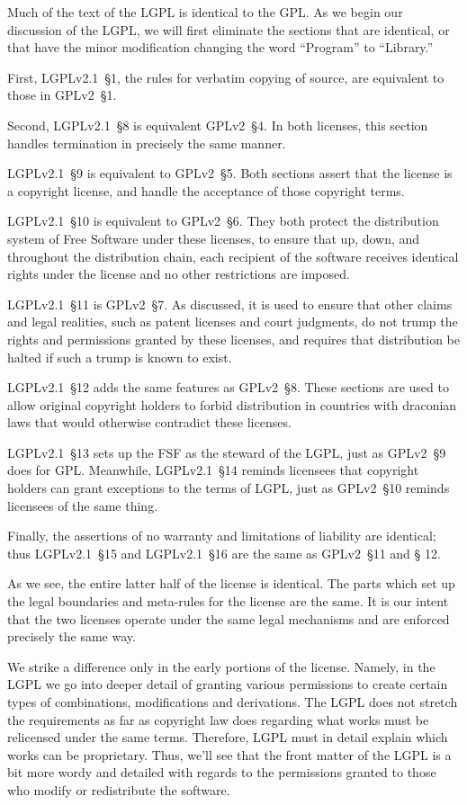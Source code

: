 Much of the text of the LGPL is identical to the GPL\@. As we begin our
discussion of the LGPL, we will first eliminate the sections that are
identical, or that have the minor modification changing the word
``Program'' to ``Library.''

First, LGPLv2.1~\S1, the rules for verbatim copying of source, are
equivalent to those in GPLv2~\S1.

Second, LGPLv2.1~\S8 is equivalent GPLv2~\S4\@. In both licenses, this
section handles termination in precisely the same manner.

LGPLv2.1~\S9 is equivalent to GPLv2~\S5\@. Both sections assert that
the license is a copyright license, and handle the acceptance of those
copyright terms.

LGPLv2.1~\S10 is equivalent to GPLv2~\S6. They both protect the
distribution system of Free Software under these licenses, to ensure that
up, down, and throughout the distribution chain, each recipient of the
software receives identical rights under the license and no other
restrictions are imposed.

LGPLv2.1~\S11 is GPLv2~\S7. As discussed, it is used to ensure that
other claims and legal realities, such as patent licenses and court
judgments, do not trump the rights and permissions granted by these
licenses, and requires that distribution be halted if such a trump is
known to exist.

LGPLv2.1~\S12 adds the same features as GPLv2~\S8. These sections are
used to allow original copyright holders to forbid distribution in
countries with draconian laws that would otherwise contradict these
licenses.

LGPLv2.1~\S13 sets up the FSF as the steward of the LGPL, just as GPLv2~\S9
does for GPL. Meanwhile, LGPLv2.1~\S14 reminds licensees that copyright
holders can grant exceptions to the terms of LGPL, just as GPLv2~\S10
reminds licensees of the same thing.

Finally, the assertions of no warranty and limitations of liability are
identical; thus LGPLv2.1~\S15 and LGPLv2.1~\S16 are the same as GPLv2~\S11 and \S
12.

As we see, the entire latter half of the license is identical.
The parts which set up the legal boundaries and meta-rules for the license
are the same. It is our intent that the two licenses operate under the
same legal mechanisms and are enforced precisely the same way.

We strike a difference only in the early portions of the license.
Namely, in the LGPL we go into deeper detail of granting various permissions to
create certain types of combinations, modifications and derivations.
The LGPL does not stretch the requirements as far as copyright law does regarding what
works must be relicensed under the same terms.  Therefore, LGPL must
in detail explain which works can be proprietary.  Thus, we'll see that the front matter of the LGPL is a
bit more wordy and detailed with regards to the permissions granted to
those who modify or redistribute the software.

